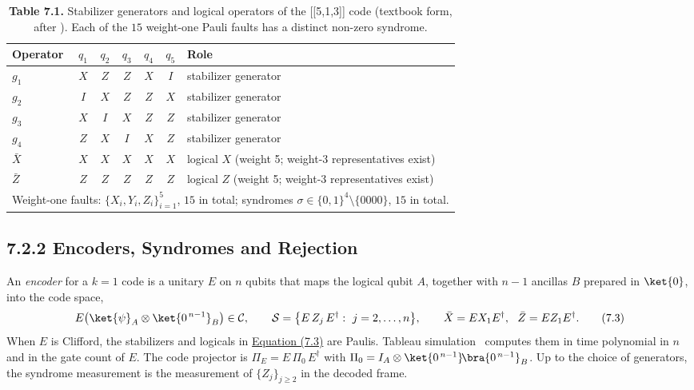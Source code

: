 \documentclass{report}
\theoremstyle{plain}
\theoremstyle{definition}
\theoremstyle{remark}
\begin{document}
\begin{table}[htbp]
\caption{\textbf{Table 7.1.} Stabilizer generators and logical operators of the [[5,1,3]] code (textbook form, after \cite{laflamme1996perfect,nielsen2010qcqi}). Each of the $15$ weight-one Pauli faults has a distinct non-zero syndrome.}
\label{tab:qec:code513}
 \small
\begin{tabular}{lcccccl}
\toprule
Operator & $q_1$ & $q_2$ & $q_3$ & $q_4$ & $q_5$ & Role \\
\midrule
$g_1$ & $X$ & $Z$ & $Z$ & $X$ & $I$ & stabilizer generator \\
$g_2$ & $I$ & $X$ & $Z$ & $Z$ & $X$ & stabilizer generator \\
$g_3$ & $X$ & $I$ & $X$ & $Z$ & $Z$ & stabilizer generator \\
$g_4$ & $Z$ & $X$ & $I$ & $X$ & $Z$ & stabilizer generator \\
\midrule
$\bar X$ & $X$ & $X$ & $X$ & $X$ & $X$ & logical $X$ (weight 5; weight-3 representatives exist) \\
$\bar Z$ & $Z$ & $Z$ & $Z$ & $Z$ & $Z$ & logical $Z$ (weight 5; weight-3 representatives exist) \\
\midrule
\multicolumn{7}{l}{Weight-one faults: $\{X_i,Y_i,Z_i\}_{i=1}^{5}$, $15$ in total; syndromes $\sigma\in\{0,1\}^{4}\setminus\{0000\}$, $15$ in total.} \\
\bottomrule
\end{tabular}
\end{table}

\subsection{7.2.2 Encoders, Syndromes and Rejection}\label{sec:qec:encoders}

An \emph{encoder} for a $k=1$ code is a unitary $E$ on $n$ qubits that maps the logical qubit $A$, together with $n-1$ ancillas $B$ prepared in $\ket{0}$, into the code space,
\hypertarget{eq:qec:encoder}{}\[
  E\big(\ket{\psi}_A\otimes\ket{0^{\,n-1}}_B\big)\in\mathcal{C},\qquad
  \mathcal{S}=\big\{E\,Z_j\,E^{\dagger}:\ j=2,\dots,n\big\},\qquad
  \bar X=E X_1 E^{\dagger},\ \ \bar Z=E Z_1 E^{\dagger}.
\tag{7.3}\]
When $E$ is Clifford, the stabilizers and logicals in \hyperref[eq:qec:encoder]{Equation (7.3)} are Paulis. Tableau simulation~\cite{aaronson2004stabilizer} computes them in time polynomial in $n$ and in the gate count of $E$. The code projector is $\Pi_E=E\,\Pi_0\,E^{\dagger}$ with $\Pi_0=I_A\otimes\ket{0^{\,n-1}}\!\bra{0^{\,n-1}}_B$. Up to the choice of generators, the syndrome measurement is the measurement of $\{Z_j\}_{j\ge 2}$ in the decoded frame.
\end{document}
